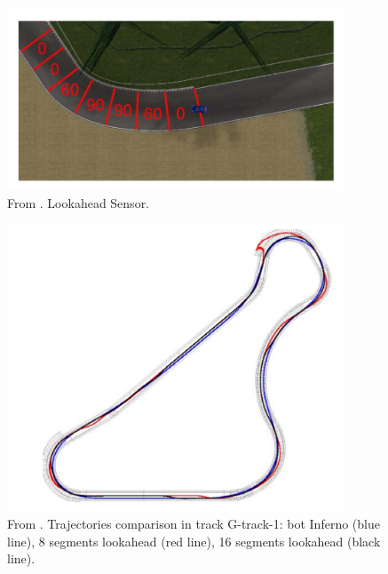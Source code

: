 \begin{figure}
 \centering
  \captionsetup{width=10cm}
  \includegraphics[width=10cm]{./img/cardamone2}
  \caption{From \cite{cardamone}. Lookahead Sensor.}
   \label{fig:cardamone2}
\end{figure}
\begin{figure}
 \centering
  \captionsetup{width=10cm}
  \includegraphics[width=10cm]{./img/cardamone}
  \caption{From \cite{cardamone}. Trajectories comparison in track G-track-1: bot Inferno (blue line), 8 segments lookahead (red line), 16 segments lookahead (black line).}
  \label{fig:cardamone}
\end{figure}

